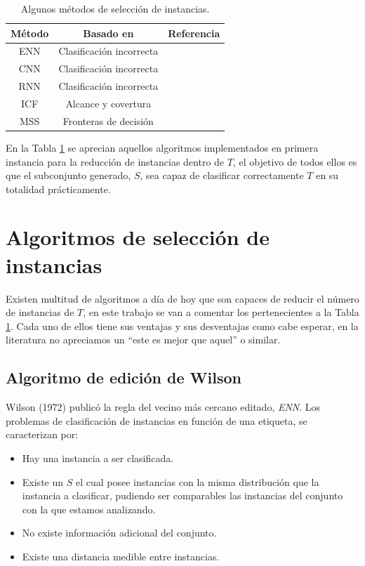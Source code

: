 \begin{table}[]
\begin{center}
	\begin{tabular}{@{}ccc@{}}
	\toprule
	\rowcolor[HTML]{EFEFEF} 
	\textbf{Método} & \textbf{Basado en}       & \textbf{Referencia} \\ \midrule
	ENN             & Clasificación incorrecta & \cite{wilson1972asymptotic}\\ \midrule
	\rowcolor[HTML]{EFEFEF} 
	CNN             & Clasificación incorrecta & \cite{hart1968condensed}\\ \midrule
	RNN             & Clasificación incorrecta & \cite{gates1972reduced}  \\ \midrule
	\rowcolor[HTML]{EFEFEF} 
	ICF             & Alcance y covertura      & \cite{brighton2002advances}\\ \midrule
	MSS             & Fronteras de decisión    & \cite{barandela2005decision}\\ \bottomrule
	\end{tabular}
\end{center}
\caption{Algunos métodos de selección de instancias.}
\label{tab:instance-selection-methods}
\end{table}

En la Tabla \ref{tab:instance-selection-methods} se aprecian aquellos algoritmos implementados en primera instancia para la reducción de instancias dentro de $T$, el objetivo de todos ellos es que el subconjunto generado, $S$, sea capaz de clasificar correctamente  $T$ en su totalidad prácticamente.

\section{Algoritmos de selección de instancias}
Existen multitud de algoritmos a día de hoy que son capaces de reducir el número de instancias de $T$, en este trabajo se van a comentar los pertenecientes a la Tabla \ref{tab:instance-selection-methods}. Cada uno de ellos tiene sus ventajas y sus desventajas como cabe esperar, en la literatura no apreciamos un ``este es mejor que aquel'' o similar.

\subsection{Algoritmo de edición de Wilson}
Wilson \cite{wilson1972asymptotic} (1972) publicó la regla del vecino más cercano editado, \textit{ENN}. Los problemas de clasificación de instancias en función de una etiqueta, se caracterizan por:
\begin{itemize}
\item Hay una instancia a ser clasificada.
\item Existe un $S$ el cual posee instancias con la misma distribución que la instancia a clasificar, pudiendo ser comparables las instancias del conjunto con la que estamos analizando.
\item No existe información adicional del conjunto.
\item Existe una distancia medible entre instancias.
\end{itemize}

